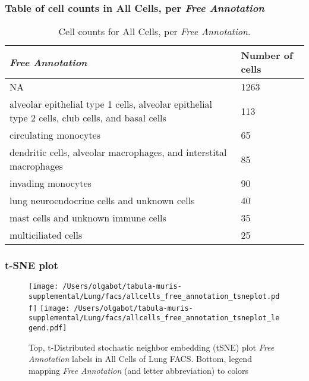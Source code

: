 \subsubsection{Table of cell counts in All Cells, per \emph{Free Annotation}}\begin{table}[h]
\centering
\label{my-label}
\begin{tabular}{@{}ll@{}}
\toprule

\emph{Free Annotation}& Number of cells \\ \midrule
NA & 1263 \\

alveolar epithelial type 1 cells, alveolar epithelial type 2 cells, club cells, and basal cells & 113 \\

circulating monocytes & 65 \\

dendritic cells, alveolar macrophages, and interstital macrophages & 85 \\

invading monocytes & 90 \\

lung neuroendocrine cells and unknown cells & 40 \\

mast cells and unknown immune cells & 35 \\

multiciliated cells & 25 \\
\bottomrule
\end{tabular}
\caption{Cell counts for All Cells, per \emph{Free Annotation}.}
\end{table}

\clearpage
\subsubsection{t-SNE plot}
\begin{figure}[h]
\centering
\texttt{[image: /Users/olgabot/tabula-muris-supplemental/Lung/facs/allcells\_free\_annotation\_tsneplot.pdf]}
\texttt{[image: /Users/olgabot/tabula-muris-supplemental/Lung/facs/allcells\_free\_annotation\_tsneplot\_legend.pdf]}
\caption{Top, t-Distributed stochastic neighbor embedding (tSNE) plot  \emph{Free Annotation} labels in All Cells of Lung FACS. Bottom, legend mapping \emph{Free Annotation} (and letter abbreviation) to colors}
\end{figure}


\clearpage


